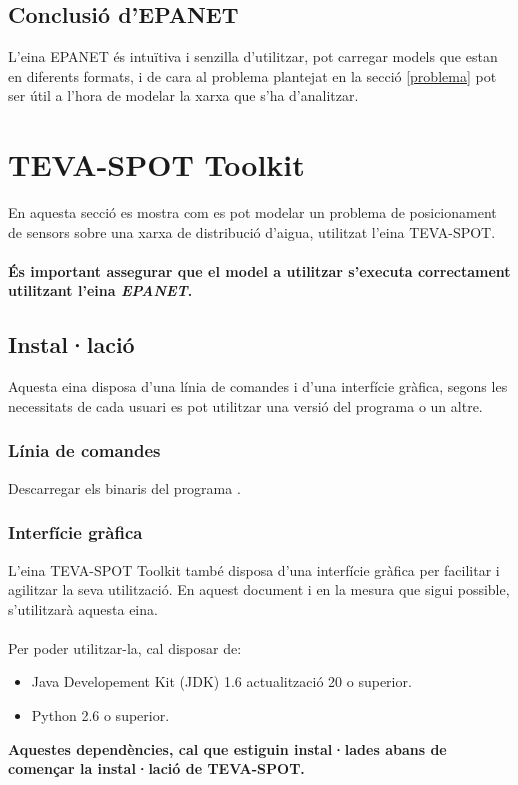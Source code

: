 \documentclass[12pt]{article}
\begin{document}
\subsection{Conclusió d'EPANET}
L'eina EPANET és intuïtiva i senzilla d'utilitzar, pot carregar models que estan en diferents formats, i de cara al problema plantejat en la secció \ref{problema} pot ser útil a l'hora de modelar la xarxa que s'ha d'analitzar.



\clearpage
\section{TEVA-SPOT Toolkit\label{teva-spoot}}
En aquesta secció es mostra com es pot modelar un problema de posicionament de sensors sobre una xarxa de distribució d'aigua, utilitzat l'eina TEVA-SPOT.
\\\\\textbf{És important assegurar que el model a utilitzar s'executa correctament utilitzant l'eina \textit{EPANET}.}
\subsection{Instal·lació}
Aquesta eina disposa d'una línia de comandes i d'una interfície gràfica, segons les necessitats de cada usuari es pot utilitzar una versió del programa o un altre.

\subsubsection{Línia de comandes}
Descarregar els binaris del programa \cite{tevaSpotExec}.

\subsubsection{Interfície gràfica}
L'eina TEVA-SPOT Toolkit també disposa d'una interfície gràfica\cite{tevaSpotGui} per facilitar i agilitzar la seva utilització. En aquest document i en la mesura que sigui possible, s'utilitzarà aquesta eina.
\\\\Per poder utilitzar-la, cal disposar de:
\begin{itemize}
	\item Java Developement Kit (JDK) 1.6 actualització 20 o superior.
	\item Python 2.6 o superior.
\end{itemize}
\textbf{Aquestes dependències, cal que estiguin instal·lades abans de començar la instal·lació de TEVA-SPOT.}
\end{document}
